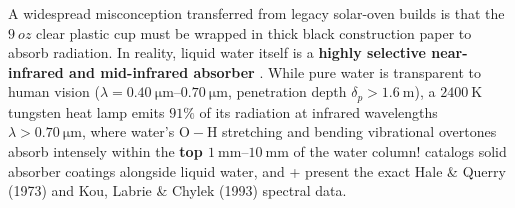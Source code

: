 A widespread misconception transferred from legacy solar-oven builds is that the $\SI{9}{oz}$ clear plastic cup must be wrapped in thick black construction paper to absorb radiation. In reality, liquid water itself is a \textbf{highly selective near-infrared and mid-infrared absorber} . While pure water is transparent to human vision ($\lambda = \SIrange{0.40}{0.70}{\micro\meter}$, penetration depth $\delta_p > \SI{1.6}{\meter}$), a $\SI{2400}{\kelvin}$ tungsten heat lamp emits $91\%$ of its radiation at infrared wavelengths $\lambda > \SI{0.70}{\micro\meter}$, where water's $\mathrm{O-H}$ stretching and bending vibrational overtones absorb intensely within the \textbf{top $\SIrange{1}{10}{\milli\meter}$} of the water column!  catalogs solid absorber coatings alongside liquid water, and  +  present the exact Hale \& Querry (1973)  and Kou, Labrie \& Chylek (1993)  spectral data.

